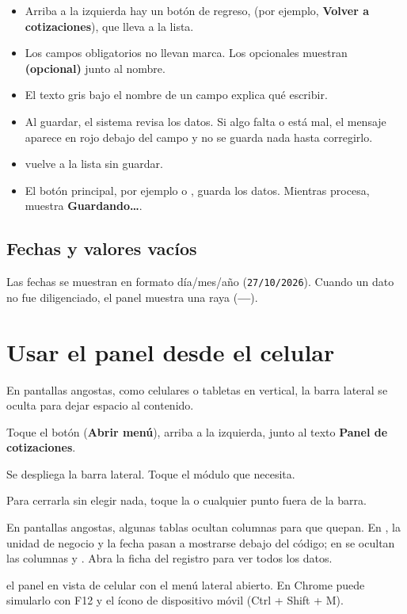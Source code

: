\begin{itemize}
  \item Arriba a la izquierda hay un botón de regreso, 
        (por ejemplo, \textbf{Volver a cotizaciones}), que lleva a la lista.
  \item Los campos obligatorios no llevan marca. Los opcionales muestran
        \textbf{(opcional)} junto al nombre.
  \item El texto gris bajo el nombre de un campo explica qué escribir.
  \item Al guardar, el sistema revisa los datos. Si algo falta o está mal, el mensaje aparece en
        rojo debajo del campo y no se guarda nada hasta corregirlo.
  \item {} vuelve a la lista sin guardar.
  \item El botón principal, por ejemplo  o ,
        guarda los datos. Mientras procesa, muestra \textbf{Guardando…}.
\end{itemize}

\subsection{Fechas y valores vacíos}

Las fechas se muestran en formato día/mes/año (\texttt{27/10/2026}). Cuando un dato no fue
diligenciado, el panel muestra una raya (\textbf{—}).

\section{Usar el panel desde el celular}\label{sec:movil}

En pantallas angostas, como celulares o tabletas en vertical, la barra lateral se oculta para
dejar espacio al contenido.

\begin{pasos}
  \item Toque el botón \textbf{\icMenu} (\textbf{Abrir menú}), arriba a la izquierda, junto al
        texto \textbf{Panel de cotizaciones}.
  \item Se despliega la barra lateral. Toque el módulo que necesita.
  \item Para cerrarla sin elegir nada, toque la \textbf{\icCerrar} o cualquier punto fuera de la barra.
\end{pasos}

\begin{nota}
En pantallas angostas, algunas tablas ocultan columnas para que quepan. En
, la unidad de negocio y la fecha pasan a mostrarse debajo del
código; en  se ocultan las columnas  y .
Abra la ficha del registro para ver todos los datos.
\end{nota}

  {el panel en vista de celular con el menú lateral abierto. En Chrome puede simularlo con
   F12 y el ícono de dispositivo móvil (Ctrl + Shift + M).}
